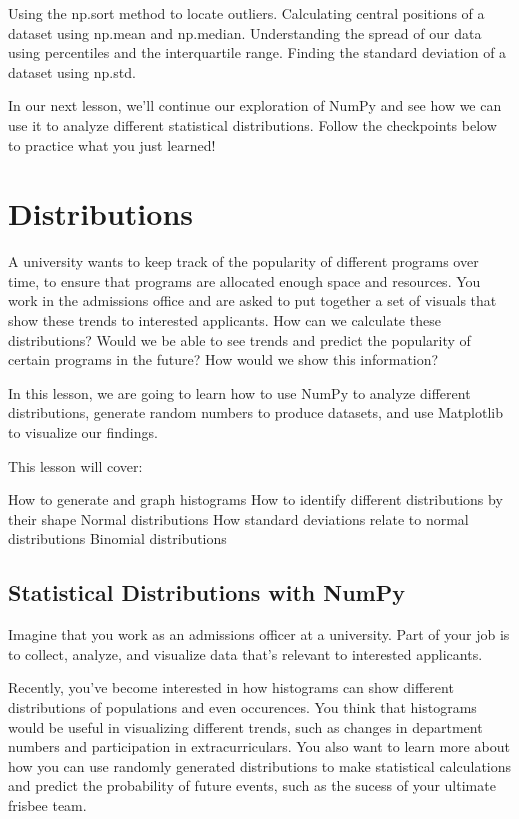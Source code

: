 \documentclass{journal}
\begin{document}
    Using the np.sort method to locate outliers.
    Calculating central positions of a dataset using np.mean and np.median.
    Understanding the spread of our data using percentiles and the interquartile range.
    Finding the standard deviation of a dataset using np.std.

In our next lesson, we'll continue our exploration of NumPy and see how we can use it to analyze different statistical distributions. Follow the checkpoints below to practice what you just learned!


\section{Distributions}

A university wants to keep track of the popularity of different programs over time, to ensure that programs are allocated enough space and resources. You work in the admissions office and are asked to put together a set of visuals that show these trends to interested applicants. How can we calculate these distributions? Would we be able to see trends and predict the popularity of certain programs in the future? How would we show this information?

In this lesson, we are going to learn how to use NumPy to analyze different distributions, generate random numbers to produce datasets, and use Matplotlib to visualize our findings.

This lesson will cover:

    How to generate and graph histograms
    How to identify different distributions by their shape
    Normal distributions
    How standard deviations relate to normal distributions
    Binomial distributions



\subsection{Statistical Distributions with NumPy}

Imagine that you work as an admissions officer at a university. Part of your job is to collect, analyze, and visualize data that's relevant to interested applicants.

Recently, you've become interested in how histograms can show different distributions of populations and even occurences. You think that histograms would be useful in visualizing different trends, such as changes in department numbers and participation in extracurriculars. You also want to learn more about how you can use randomly generated distributions to make statistical calculations and predict the probability of future events, such as the sucess of your ultimate frisbee team.
\end{document}
